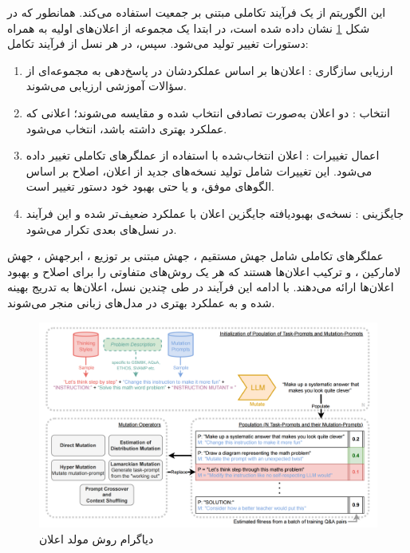 این الگوریتم از یک فرآیند تکاملی مبتنی بر جمعیت
 استفاده می‌کند. همانطور که در شکل \ref{fig_promptbreeder} نشان داده شده است، در ابتدا یک مجموعه از اعلان‌های اولیه به همراه دستورات تغییر تولید می‌شود. سپس، در هر نسل از فرآیند تکامل: 
 \begin{enumerate}
 	\item ارزیابی سازگاری
 	: اعلان‌ها بر اساس عملکردشان در پاسخ‌دهی به مجموعه‌ای از سؤالات آموزشی ارزیابی می‌شوند.
 	
 	\item انتخاب
 	: دو اعلان به‌صورت تصادفی انتخاب شده و مقایسه می‌شوند؛ اعلانی که عملکرد بهتری داشته باشد، انتخاب می‌شود.
 	
 	\item اعمال تغییرات
 	: اعلان انتخاب‌شده با استفاده از عملگرهای تکاملی تغییر داده می‌شود. این تغییرات شامل تولید نسخه‌های جدید از اعلان، اصلاح بر اساس الگوهای موفق، و یا حتی بهبود خود دستور تغییر است.  
 	
 	\item جایگزینی
 	: نسخه‌ی بهبودیافته جایگزین اعلان با عملکرد ضعیف‌تر شده و این فرآیند در نسل‌های بعدی تکرار می‌شود.
 \end{enumerate} 

عملگرهای تکاملی شامل جهش مستقیم
، جهش مبتنی بر توزیع
، ابرجهش
، جهش لامارکین
، و ترکیب اعلان‌ها
 هستند که هر یک روش‌های متفاوتی را برای اصلاح و بهبود اعلان‌ها ارائه می‌دهند. با ادامه این فرآیند در طی چندین نسل، اعلان‌ها به تدریج بهینه شده و به عملکرد بهتری در مدل‌های زبانی منجر می‌شوند.  
 
\begin{figure}[!t]
	\centering
	\includegraphics[width=140mm]{images/promptbreeder}
	\caption{دیاگرام روش مولد اعلان}
	\label{fig_promptbreeder}
\end{figure}


